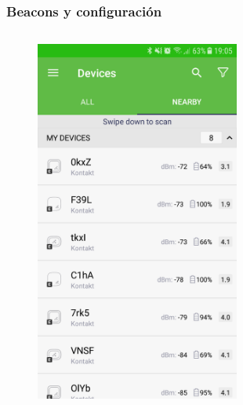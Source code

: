 \documentclass[handout]{beamer}
\begin{document}
\begin{frame}
\frametitle{Beacons y configuración}

\begin{columns}[t] %

\begin{figure}
\includegraphics[width=0.6\textwidth]{../figures/kontaktapp1.png}
\end{figure}


\end{columns}
\end{frame}
\end{document}
